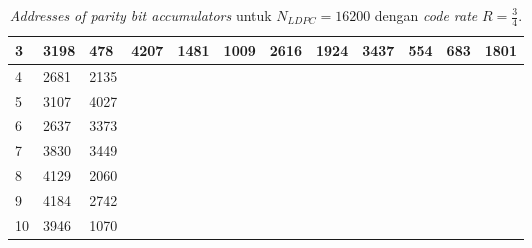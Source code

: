 \begin{table}[tb]
	\centering
	\caption{\textit{Addresses of parity bit accumulators} untuk $N_{LDPC}=16200$ dengan \textit{code rate} $R=\frac{3}{4}$.}
	\label{table:rate2}
	\begin{tabular}{|l|l|l|lllllllll}
		\hline
		3  & 3198 & 478  & \multicolumn{1}{l|}{4207} & \multicolumn{1}{l|}{1481} & \multicolumn{1}{l|}{1009} & \multicolumn{1}{l|}{2616} & \multicolumn{1}{l|}{1924} & \multicolumn{1}{l|}{3437} & \multicolumn{1}{l|}{554} & \multicolumn{1}{l|}{683} & \multicolumn{1}{l|}{1801} \\ \hline
		4  & 2681 & 2135 &                           &                           &                           &                           &                           &                           &                          &                          &                           \\ \cline{1-3}
		5  & 3107 & 4027 &                           &                           &                           &                           &                           &                           &                          &                          &                           \\ \cline{1-3}
		6  & 2637 & 3373 &                           &                           &                           &                           &                           &                           &                          &                          &                           \\ \cline{1-3}
		7  & 3830 & 3449 &                           &                           &                           &                           &                           &                           &                          &                          &                           \\ \cline{1-3}
		8  & 4129 & 2060 &                           &                           &                           &                           &                           &                           &                          &                          &                           \\ \cline{1-3}
		9  & 4184 & 2742 &                           &                           &                           &                           &                           &                           &                          &                          &                           \\ \cline{1-3}
		10 & 3946 & 1070 &                           &                           &                           &                           &                           &                           &                          &                          &                           \\ \cline{1-3}

\end{tabular}
\end{table}
